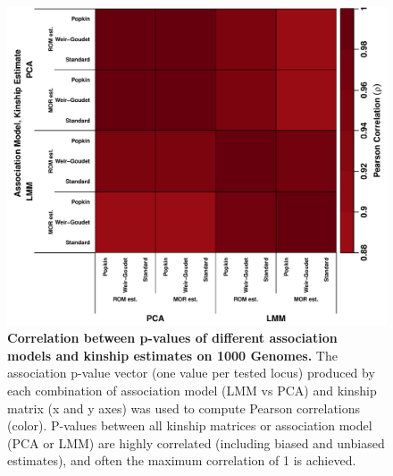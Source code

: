 \documentclass[11pt]{article}
\begin{document}
\begin{figure}[hp!]
  \centering
  \includegraphics[width=\textwidth]{tgp-nygc-autosomes_ld_prune_1000kb_0.3_maf-0.01/pvals_cor.pdf}
  \caption{
    {\bf Correlation between p-values of different association models and kinship estimates on 1000 Genomes.}
    The association p-value vector (one value per tested locus) produced by each combination of association model (LMM vs PCA) and kinship matrix (x and y axes) was used to compute Pearson correlations (color).
    P-values between all kinship matrices or association model (PCA or LMM) are highly correlated (including biased and unbiased estimates), and often the maximum correlation of 1 is achieved.
  }
  \label{fig:pvals_cor_real}
\end{figure}
\end{document}

